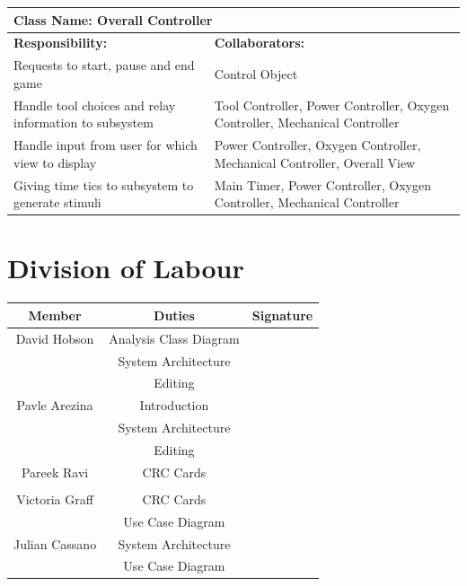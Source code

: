 \documentclass[12pt, titlepage]{article}
\begin{document}
	\begin{table}[H]
		\centering
		\begin{tabular}{|p{10cm}|p{5cm}|}
		\hline 
		 \multicolumn{2}{|l|}{\textbf{Class Name: Overall Controller}} \\
		\hline
		\textbf{Responsibility:} & \textbf{Collaborators:} \\
		\hline
		 Requests to start, pause and end game & Control Object \\
		\hline
		 Handle tool choices and relay information to subsystem & Tool Controller, Power Controller, Oxygen Controller, Mechanical Controller\\
		\hline
		 Handle input from user for which view to display & Power Controller, Oxygen Controller, Mechanical Controller, Overall View \\
		\hline
		 Giving time tics to subsystem to generate stimuli & Main Timer, Power Controller, Oxygen Controller, Mechanical Controller \\
		\hline
		\end{tabular}
	\end{table}



\appendix
\section{Division of Labour}
\label{sec:division_of_labour}
\begin{table}[h!]
\centering


\begin{tabular}{|c|c|c|}
\hline
{\bf Member} & {\bf Duties}&{\bf Signature}\\
\hline
{David Hobson} & {Analysis Class Diagram } & { }\\
{} & {System Architecture}  & {}\\
{} & {Editing} & {}\\
\hline
{Pavle Arezina} & {Introduction} & {}\\
{} & {System Architecture} & {}\\
{} & {Editing} & {}\\
\hline
{Pareek Ravi} & {CRC Cards} & {}\\
{} & {} & {}\\
\hline
{Victoria Graff} & {CRC Cards} & {}\\
{} & {Use Case Diagram} & {}\\
\hline
{Julian Cassano} & {System Architecture} & {}\\
{} & {Use Case Diagram} & {}\\
\hline
\end{tabular}

\end{table}
\end{document}
